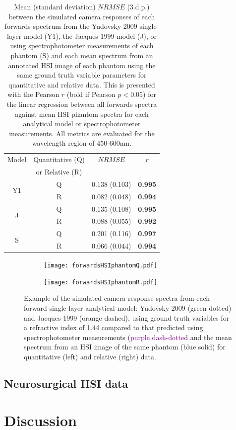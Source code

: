 \begin{table}[h!] %
    \centering
    \caption{Mean (standard deviation) $NRMSE$ (3.d.p.) between the simulated camera responses of each forwards spectrum from the Yudovsky 2009 single-layer model (Y1), the Jacques 1999 model (J), or using spectrophotometer measurements of each phantom (S) and each mean spectrum from an annotated HSI image of each phantom using the same ground truth variable parameters for quantitative and relative data. This is presented with the Pearson $r$ (bold if Pearson $p < 0.05$) for the linear regression between all forwards spectra against mean HSI phantom spectra for each analytical model or spectrophotometer measurements. All metrics are evaluated for the wavelength region of 450-600nm.}
    \begin{tabular}{|c|c|cc|}
        \hline
        Model & Quantitative (Q) & $NRMSE$ & $r$ \\
         & or Relative (R) &  & \\
        \hline
        \multirow{2}{*}{Y1} & Q & 0.138 (0.103) & \textbf{0.995} \\
        & R & 0.082 (0.048) & \textbf{0.994} \\
        \hline
        \multirow{2}{*}{J} & Q & 0.135 (0.108) & \textbf{0.995} \\
        & R & 0.088 (0.055) & \textbf{0.992} \\
        \hline
        \multirow{2}{*}{S} & Q & 0.201 (0.116) & \textbf{0.997} \\
         & R & 0.066 (0.044) & \textbf{0.994} \\
        \hline
    \end{tabular}
    \label{tb:forwardsHSIphantoms}
\end{table}

\begin{figure}[h!]
    \centering
    \begin{subfigure}{0.49\textwidth}
        \texttt{[image: forwardsHSIphantomQ.pdf]}
        \caption{}
        \label{fig:egforwardsHSIQ}
    \end{subfigure}
    \begin{subfigure}{0.49\textwidth}
        \texttt{[image: forwardsHSIphantomR.pdf]}
        \caption{}
        \label{fig:egforwardsHSIR}
    \end{subfigure}
    \caption{Example of the simulated camera response spectra from each forward single-layer analytical model: Yudovsky 2009 (\textcolor{MyGreen}{green dotted}) and Jacques 1999 (\textcolor{MyOrange}{orange dashed}), using ground truth variables for a refractive index of 1.44 compared to that predicted using spectrophotometer measurements (\textcolor{purple}{purple dash-dotted} and the mean spectrum from an HSI image of the same phantom (\textcolor{MyBlue}{blue solid}) for quantitative (left) and relative (right) data.}
    \label{fig:forwardsHSIphantoms}
\end{figure}


\subsection{Neurosurgical HSI data}

\section{Discussion}